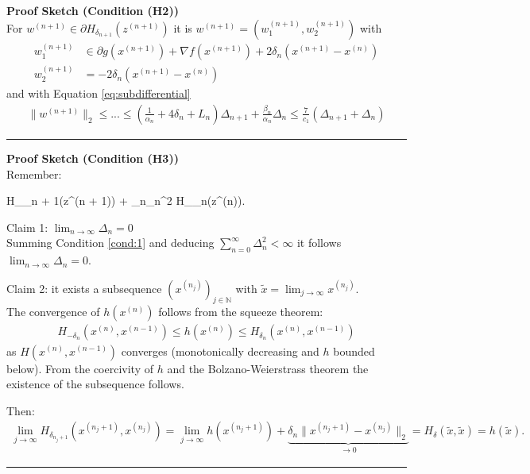\documentclass[onecolumn,final,a4paper,13pt,reqno]{siamart}
\begin{document}
	\textbf{Proof Sketch (Condition (H2))}\\
	For $w^{(n + 1)} \in \partial H_{\delta_{n + 1}}(z^{(n + 1)})$ it is $w^{(n + 1)} = (w_1^{(n + 1)}, w_2^{(n + 1)})$ with
	\begin{align}
		w_1^{(n + 1)} &\in \partial g(x^{(n + 1)}) + \nabla f(x^{(n + 1)}) + 2 \delta_n (x^{(n + 1)} - x^{(n)})\\
		w_2^{(n + 1)} &= -2\delta_n(x^{(n + 1)} - x^{(n)})
	\end{align}
	and with Equation \eqref{eq:subdifferential}
	\begin{align}
		\|w^{(n + 1)}\|_2 \leq ... \leq (\frac{1}{\alpha_n} + 4\delta_n + L_n)\Delta_{n + 1} + \frac{\beta_n}{\alpha_n} \Delta_n \leq \frac{7}{c_1}(\Delta_{n + 1} + \Delta_n)
	\end{align}
	\noindent\rule{\textwidth}{0.1pt}
	
	\textbf{Proof Sketch (Condition (H3))}\\
	Remember: 
	\begin{Lalign}
		H_{\delta_{n + 1}}(z^{(n + 1)}) + \gamma_n\Delta_n^2 \leq H_{\delta_n}(z^{(n)})\label{cond:1}.
	\end{Lalign}
	Claim 1: $\lim_{n \rightarrow \infty} \Delta_n = 0$\\
	Summing Condition \eqref{cond:1} and deducing $\sum_{n = 0}^\infty \Delta_n^2 < \infty$ it follows $\lim_{n \rightarrow \infty} \Delta_n = 0$.
	
	Claim 2: it exists a subsequence $(x^{(n_j)})_{j \in \mathbb{N}}$ with $\tilde{x} = \lim_{j \rightarrow \infty} x^{(n_j)}$.\\
	The convergence of $h(x^{(n)})$ follows from the squeeze theorem:
	\begin{align}
		H_{-\delta_n}(x^{(n)}, x^{(n - 1)}) \leq h(x^{(n)}) \leq H_{\delta_n}(x^{(n)}, x^{(n - 1)})
	\end{align}
	as $H(x^{(n)}, x^{(n - 1)})$ converges (monotonically decreasing and $h$ bounded below).
	From the coercivity of $h$ and the Bolzano-Weierstrass theorem the existence of the subsequence follows.
	
	Then:
	\begin{align}
		\lim_{j \rightarrow \infty} H_{\delta_{n_j + 1}}(x^{(n_j + 1)}, x^{(n_j)}) = \lim_{j \rightarrow \infty} h(x^{(n_j + 1)}) + \underbrace{\delta_n\|x^{(n_j + 1)} - x^{(n_j)}\|_2}_{\rightarrow 0} = H_\delta(\tilde{x}, \tilde{x}) = h(\tilde{x}).
	\end{align}
	\noindent\rule{\textwidth}{0.1pt}
	
\end{document}
